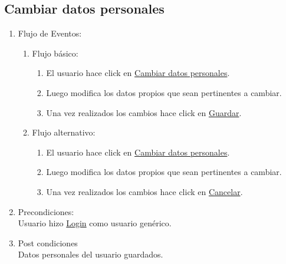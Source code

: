 \documentclass[a4paper,11pt]{article}
\begin{document}
\subsection{Cambiar datos personales}
\begin{enumerate}


    \begin{enumerate}
    \item Descripción breve: \\
        Este caso de uso describe la modificación de datos personales de un 
        usuario genérico del sistema.
    \item Actores \\
        Usuario genérico.
    \item Disparadores: \\
        El usuario hace click en \underline{Cambiar datos personales}
        dentro de su panel de usuario.
    \end{enumerate}

    \item Flujo de Eventos: 
    \begin{enumerate}

        \item Flujo básico:
                \begin{enumerate}
            		\item El usuario hace click en \underline{Cambiar datos personales}. 
            		\item Luego modifica los datos propios que sean pertinentes a cambiar. 
            		\item Una vez realizados los cambios hace click en \underline{Guardar}. 
		\end{enumerate}
        \item Flujo alternativo:
                \begin{enumerate}
            		\item El usuario hace click en \underline{Cambiar datos personales}. 
            		\item Luego modifica los datos propios que sean pertinentes a cambiar.
            		\item Una vez realizados los cambios hace click en \underline{Cancelar}.
		\end{enumerate}
    \end{enumerate}

    \item Precondiciones: \\
        Usuario hizo \underline{Login} como usuario genérico.

    \item Post condiciones \\
        Datos personales del usuario guardados.

\end{enumerate}
\end{document}
